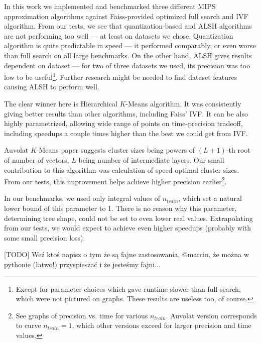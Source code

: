 In this work we implemented and benchmarked three different MIPS 
approximation algorithms
against Faiss-provided optimized full search and IVF algorithm.
From our tests, we see that quantization-based and ALSH algorithms
are not performing too well --- at least on datasets we chose.
Quantization algorithm is quite predictable in speed --- it performed
comparably, or even worse than full search on all large benchmarks.
On the other hand, ALSH gives results dependent on dataset --- for
two of three datasets we used, its precision was too low to be useful\footnote{
Except for parameter choices which gave runtime slower than full search,
which were not pictured on graphs. These results are useless too, of course.}.
Further research might be needed to find dataset features causing
ALSH to perform well.

The clear winner here is Hierarchical $K$-Means algorithm. It was consistently
giving better results than other algorithms, including Faiss' IVF. It can be also
highly parametrized, allowing wide range of points on time-precision tradeoff,
including speedups a couple times higher than the best we could get from IVF.

Auvolat $K$-Means paper suggests cluster sizes being powers of $(L+1)$-th
root of number of vectors, $L$ being number of intermediate layers. Our
small contribution to this algorithm was calculation of speed-optimal
cluster sizes. From our tests, this improvement helps achieve higher precision
earlier\footnote{
See graphs of precision vs. time for various $n_{train}$. Auvolat version
corresponds to curve $n_{train} = 1$, which other versions exceed for larger
precision and time values.
}.

In our benchmarks, we used only integral values of $n_{train}$, which set
a natural lower bound of this parameter to 1. There is no reason why this
parameter, determining tree shape, could not be set to even lower real values.
Extrapolating from our tests, we would expect to achieve even higher speedups
(probably with some small precision loss).

[TODO] Weź ktoś napisz o tym że są fajne zastosowania, @marcin, że można w
pythonie (łatwo!) przyspieszać i że jesteśmy fajni...

